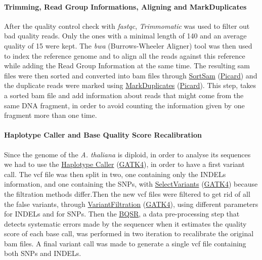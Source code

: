 \documentclass[10pt,a4paper]{article}
\begin{document}
\paragraph{Trimming, Read Group Informations, Aligning and MarkDuplicates} After the quality control check with \textit{fastqc}\cite{andrews2012}, \textit{Trimmomatic}\cite{bolger_trimmomatic:_2014} was used to filter out bad quality reads. Only the ones with a minimal length of 140 and an average quality of 15 were kept. The \textit{bwa} (Burrows-Wheeler Aligner) tool was then used to index the reference genome
and to align all the reads against this reference while adding the Read Group Information at the same time. The resulting sam files were then sorted and converted into bam files through  \href{https://software.broadinstitute.org/gatk/documentation/tooldocs/4.0.8.0/picard_sam_SortSam.php}{SortSam} (\href{https://broadinstitute.github.io/picard/}{Picard}) and the duplicate reads were marked using  \href{https://software.broadinstitute.org/gatk/documentation/tooldocs/4.0.4.0/picard_sam_markduplicates_MarkDuplicates.php}{MarkDuplicates} (\href{https://broadinstitute.github.io/picard/}{Picard}). This step, takes a sorted bam file and  add information about reads that might come from the same DNA fragment, in order to avoid counting the information given by one fragment more than one time. 

\paragraph{Haplotype Caller and Base Quality Score Recalibration} Since the genome of the \textit{A. thaliana} is diploid, in order to analyse its sequences we had to use the \href{https://software.broadinstitute.org/gatk/documentation/tooldocs/3.8-0/org_broadinstitute_gatk_tools_walkers_haplotypecaller_HaplotypeCaller.php}{Haplotype Caller} (\href{https://software.broadinstitute.org/gatk/}{GATK4}), in order to have a first variant call. The vcf file was then split in two, one containing only the INDELs information, and one containing the SNPs, with  \href{https://software.broadinstitute.org/gatk/documentation/tooldocs/3.8-0/org_broadinstitute_gatk_tools_walkers_variantutils_SelectVariants.php}{SelectVariants} (\href{https://software.broadinstitute.org/gatk/}{GATK4}) because the filtration methods differ.Then the new vcf files were filtered to get rid of all the false variants, through  \href{https://software.broadinstitute.org/gatk/documentation/tooldocs/3.8-0/org_broadinstitute_gatk_tools_walkers_filters_VariantFiltration.php}{VariantFiltration} (\href{https://software.broadinstitute.org/gatk/}{GATK4}), using different parameters for INDELs and for SNPs. Then the \href{https://gatkforums.broadinstitute.org/gatk/discussion/44/base-quality-score-recalibration-bqsr}{BQSR}, a data pre-processing step that detects systematic errors made by the sequencer when it estimates the quality score of each base call, was performed in two iteration to recalibrate the original bam files. A final variant call was made to generate a single vcf file containing both SNPs and INDELs. 
\end{document}
